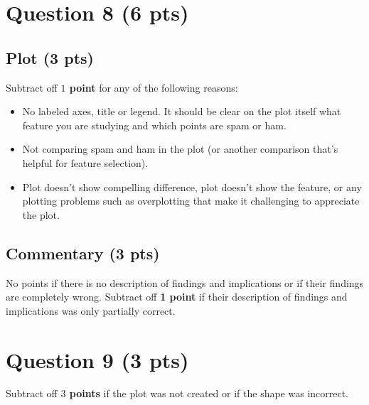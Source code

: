 \documentclass{article}
\begin{document}
\section*{Question 8 (6 pts)}

\subsection*{Plot (3 pts)}

Subtract off {\bf $1$ point} for any of the following reasons:
\begin{itemize}
\item No labeled axes, title or legend. It should be clear on the plot itself what feature you are studying and which points are spam or ham.
\item Not comparing spam and ham in the plot (or another comparison that's helpful for feature selection).
\item Plot doesn't show compelling difference, plot doesn't show the feature, or any plotting problems such as overplotting that make it challenging to appreciate the plot.
\end{itemize}

\subsection*{Commentary (3 pts)}

No points if there is no description of findings and implications or if their findings are completely wrong. Subtract off {\bf 1 point} if their description of findings and implications was only partially correct.

\section*{Question 9 (3 pts)}

Subtract off {\bf $3$ points} if the plot was not created or if the shape was incorrect.
\end{document}

